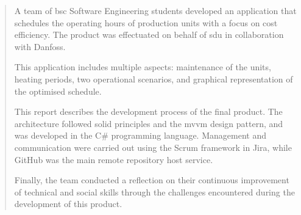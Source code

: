 

\vspace{\fill}
\begin{center}
    \begin{minipage}{0.73 \textwidth} 

        \vspace{4.5cm}

        \begin{abstract}
            \vspace{0.3cm}
            A team of \acrshort{bsc} Software Engineering students developed an application that schedules the operating hours of production units with a focus on cost efficiency. The product was effectuated on behalf of \acrfull{sdu} in collaboration with Danfoss.\vspace{0.3cm}

            This application includes multiple aspects: maintenance of the units, heating periods, two operational scenarios, and graphical representation of the optimised schedule.\vspace{0.3cm}

            This report describes the development process of the final product. The architecture followed \acrshort{solid} principles and the \acrshort{mvvm} design pattern, and was developed in the C\# programming language. Management and communication were carried out using the Scrum framework in Jira, while GitHub was the main remote repository host service.\vspace{0.3cm}

            Finally, the team conducted a reflection on their continuous improvement of technical and social skills through the challenges encountered during the development of this product.
        \end{abstract}
    \end{minipage}
\end{center}